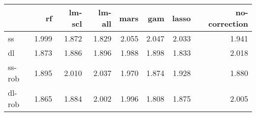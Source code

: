 \begin{tabular}{lrrrrrrr}
\toprule
 & rf & lm-scl & lm-all & mars & gam & lasso & no-correction \\
\midrule
ss & {\cellcolor[HTML]{3A3A3A}} \color[HTML]{F1F1F1} 1.999 & {\cellcolor[HTML]{C2C2C2}} \color[HTML]{000000} 1.872 & {\cellcolor[HTML]{F1F1F1}} \color[HTML]{000000} 1.829 & {\cellcolor[HTML]{000000}} \color[HTML]{F1F1F1} 2.055 & {\cellcolor[HTML]{080808}} \color[HTML]{F1F1F1} 2.047 & {\cellcolor[HTML]{171717}} \color[HTML]{F1F1F1} 2.033 & {\cellcolor[HTML]{7A7A7A}} \color[HTML]{F1F1F1} 1.941 \\
dl & {\cellcolor[HTML]{BDBDBD}} \color[HTML]{000000} 1.873 & {\cellcolor[HTML]{ABABAB}} \color[HTML]{F1F1F1} 1.886 & {\cellcolor[HTML]{9F9F9F}} \color[HTML]{F1F1F1} 1.896 & {\cellcolor[HTML]{272727}} \color[HTML]{F1F1F1} 1.988 & {\cellcolor[HTML]{9D9D9D}} \color[HTML]{F1F1F1} 1.898 & {\cellcolor[HTML]{F1F1F1}} \color[HTML]{000000} 1.833 & {\cellcolor[HTML]{000000}} \color[HTML]{F1F1F1} 2.018 \\
ss-rob & {\cellcolor[HTML]{D1D1D1}} \color[HTML]{000000} 1.895 & {\cellcolor[HTML]{272727}} \color[HTML]{F1F1F1} 2.010 & {\cellcolor[HTML]{000000}} \color[HTML]{F1F1F1} 2.037 & {\cellcolor[HTML]{626262}} \color[HTML]{F1F1F1} 1.970 & {\cellcolor[HTML]{F1F1F1}} \color[HTML]{000000} 1.874 & {\cellcolor[HTML]{A0A0A0}} \color[HTML]{F1F1F1} 1.928 & {\cellcolor[HTML]{E8E8E8}} \color[HTML]{000000} 1.880 \\
dl-rob & {\cellcolor[HTML]{ACACAC}} \color[HTML]{000000} 1.865 & {\cellcolor[HTML]{949494}} \color[HTML]{F1F1F1} 1.884 & {\cellcolor[HTML]{040404}} \color[HTML]{F1F1F1} 2.002 & {\cellcolor[HTML]{0B0B0B}} \color[HTML]{F1F1F1} 1.996 & {\cellcolor[HTML]{F1F1F1}} \color[HTML]{000000} 1.808 & {\cellcolor[HTML]{9F9F9F}} \color[HTML]{F1F1F1} 1.875 & {\cellcolor[HTML]{000000}} \color[HTML]{F1F1F1} 2.005 \\
\bottomrule
\end{tabular}
